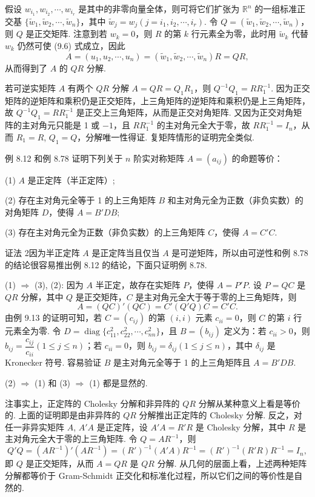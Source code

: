 \documentclass[UTF8,12pt,a4paper,fontset=fandol]{ctexart}
\begin{document}
假设 $w_{i_1},w_{i_2},\cdots,w_{i_r}$ 是其中的非零向量全体，则可将它们扩张为 $\mathbb{R}^n$ 的一组标准正交基 $\{\widetilde{w}_1,\widetilde{w}_2,\cdots,\widetilde{w}_n\}$，其中 $\widetilde{w}_j=w_j(j=i_1,i_2,\cdots,i_r)$. 令 $Q=(\widetilde{w}_1,\widetilde{w}_2,\cdots,\widetilde{w}_n)$，则 $Q$ 是正交矩阵. 注意到若 $w_k=0$，则 $R$ 的第 $k$ 行元素全为零，此时用 $\widetilde{w}_k$ 代替 $w_k$ 仍然可使 (9.6) 式成立，因此
\[
A=(u_1,u_2,\cdots,u_n)=(\widetilde{w}_1,\widetilde{w}_2,\cdots,\widetilde{w}_n)R=QR,
\]
从而得到了 $A$ 的 $QR$ 分解.

若可逆实矩阵 $A$ 有两个 $QR$ 分解 $A=QR=Q_1R_1$，则 $Q^{-1}Q_1=RR_1^{-1}$. 因为正交矩阵的逆矩阵和乘积仍是正交矩阵，上三角矩阵的逆矩阵和乘积仍是上三角矩阵，故 $Q^{-1}Q_1=RR_1^{-1}$ 是正交上三角矩阵，从而是正交对角矩阵. 又因为正交对角矩阵的主对角元只能是 1 或 $-1$，且 $RR_1^{-1}$ 的主对角元全大于零，故 $RR_1^{-1}=I_n$，从而 $R_1=R$, $Q_1=Q$，分解唯一性得证. 复矩阵情形的证明完全类似.

例 8.12 和例 8.78 证明下列关于 $n$ 阶实对称矩阵 $A=(a_{ij})$ 的命题等价：

(1) $A$ 是正定阵（半正定阵）;

(2) 存在主对角元全等于 1 的上三角矩阵 $B$ 和主对角元全为正数（非负实数）的对角矩阵 $D$，使得 $A=B'DB$;

(3) 存在主对角元全为正数（非负实数）的上三角矩阵 $C$，使得 $A=C'C$.

证法 2\quad 因为半正定阵 $A$ 是正定阵当且仅当 $A$ 是可逆矩阵，所以由可逆性和例 8.78 的结论很容易推出例 8.12 的结论，下面只证明例 8.78.

(1) $\Rightarrow$ (3), (2): 因为 $A$ 半正定，故存在实矩阵 $P$，使得 $A=P'P$. 设 $P=QC$ 是 $QR$ 分解，其中 $Q$ 是正交矩阵，$C$ 是主对角元全大于等于零的上三角矩阵，则
\[
A=(QC)'(QC)=C'(Q'Q)C=C'C.
\]
由例 9.13 的证明可知，若 $C=(c_{ij})$ 的第 $(i,i)$ 元素 $c_{ii}=0$，则 $C$ 的第 $i$ 行元素全为零. 令 $D=\operatorname{diag}\{c_{11}^2,c_{22}^2,\cdots,c_{nn}^2\}$，且 $B=(b_{ij})$ 定义为：若 $c_{ii}>0$，则 $b_{ij}=\dfrac{c_{ij}}{c_{ii}}(1\le j\le n)$；若 $c_{ii}=0$，则 $b_{ij}=\delta_{ij}(1\le j\le n)$，其中 $\delta_{ij}$ 是 Kronecker 符号. 容易验证 $B$ 是主对角元全等于 1 的上三角矩阵且 $A=B'DB$.

(2) $\Rightarrow$ (1) 和 (3) $\Rightarrow$ (1) 都是显然的.

注\quad 事实上，正定阵的 Cholesky 分解和非异阵的 $QR$ 分解从某种意义上看是等价的. 上面的证明即是由非异阵的 $QR$ 分解推出正定阵的 Cholesky 分解. 反之，对任一非异实矩阵 $A$, $A'A$ 是正定阵，设 $A'A=R'R$ 是 Cholesky 分解，其中 $R$ 是主对角元全大于零的上三角矩阵. 令 $Q=AR^{-1}$，则
\[
Q'Q=(AR^{-1})'(AR^{-1})=(R')^{-1}(A'A)R^{-1}=(R')^{-1}(R'R)R^{-1}=I_n,
\]
即 $Q$ 是正交矩阵，从而 $A=QR$ 是 $QR$ 分解. 从几何的层面上看，上述两种矩阵分解都等价于 Gram-Schmidt 正交化和标准化过程，所以它们之间的等价性是自然的.
\end{document}
